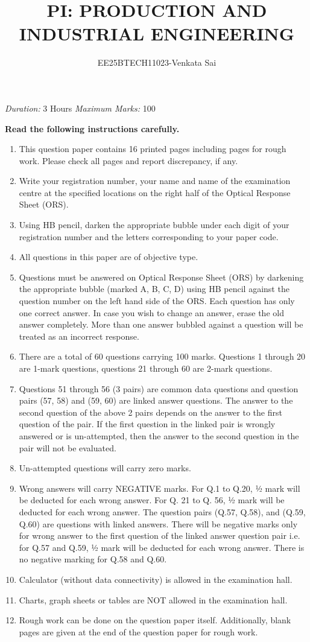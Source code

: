 \documentclass[journal,12pt,onecolumn]{IEEEtran}
\title{PI: PRODUCTION AND INDUSTRIAL ENGINEERING}
\author{EE25BTECH11023-Venkata Sai}
\theoremstyle{remark}
\begin{document}
{\centering
  \maketitle
  \textit{\large Duration:} 3 Hours \hfill \textit{\large Maximum Marks:} 100
}

\textbf{Read the following instructions carefully.}
\begin{enumerate}[leftmargin=0.5cm,label=\arabic*.]
 \setlength\itemsep{0.6em}
\item This question paper contains 16 printed pages including pages for rough work. Please check all pages and report discrepancy, if any.
\item Write your registration number, your name and name of the examination centre at the specified locations on the right half of the Optical Response Sheet (ORS).
\item Using HB pencil, darken the appropriate bubble under each digit of your registration number and the letters corresponding to your paper code.
\item All questions in this paper are of objective type.
\item Questions must be answered on Optical Response Sheet (ORS) by darkening the appropriate bubble (marked A, B, C, D) using HB pencil against the question number on the left hand side of the ORS. Each question has only one correct answer. In case you wish to change an answer, erase the old answer completely. More than one answer bubbled against a question will be treated as an incorrect response.
\item There are a total of 60 questions carrying 100 marks. Questions 1 through 20 are 1-mark questions, questions 21 through 60 are 2-mark questions.
\item Questions 51 through 56 (3 pairs) are common data questions and question pairs (57, 58) and (59, 60) are linked answer questions. The answer to the second question of the above 2 pairs depends on the answer to the first question of the pair. If the first question in the linked pair is wrongly answered or is un-attempted, then the answer to the second question in the pair will not be evaluated.
\item Un-attempted questions will carry zero marks.
\item Wrong answers will carry NEGATIVE marks. For Q.1 to Q.20, ½ mark will be deducted for each wrong answer. For Q. 21 to Q. 56, ½ mark will be deducted for each wrong answer. The question pairs (Q.57, Q.58), and (Q.59, Q.60) are questions with linked answers. There will be negative marks only for wrong answer to the first question of the linked answer question pair i.e. for Q.57 and Q.59, ½ mark will be deducted for each wrong answer. There is no negative marking for Q.58 and Q.60.
\item Calculator (without data connectivity) is allowed in the examination hall.
\item Charts, graph sheets or tables are NOT allowed in the examination hall.
\item Rough work can be done on the question paper itself. Additionally, blank pages are given at the end of the question paper for rough work.
\end{enumerate}
\end{document}
